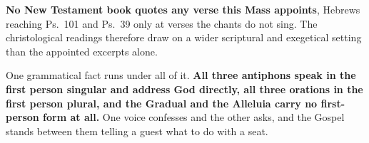 \textbf{No New Testament book quotes any verse this Mass appoints}, Hebrews
reaching Ps.~101 and Ps.~39 only at verses the chants do not sing. The
christological readings therefore draw on a wider scriptural and exegetical
setting than the appointed excerpts alone.

One grammatical fact runs under all of it. \textbf{All three antiphons speak in
the first person singular and address God directly, all three orations in the
first person plural, and the Gradual and the Alleluia carry no first-person form
at all.} One voice confesses and the other asks, and the Gospel stands between
them telling a guest what to do with a seat.

\label{triptych:brief-synthesis:end}
\clearpage
